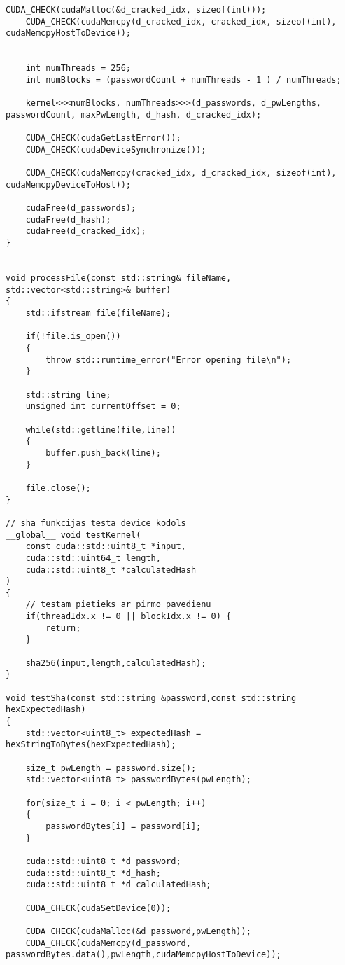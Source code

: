 \documentclass[12pt]{report}%
\theoremstyle{definition}
\begin{document}
\begin{lstlisting}[caption={Paroļu lauzēja implementācija CUDA vidē},
  label=lst:cuda_impl,
  captionpos=t
  ]
    CUDA_CHECK(cudaMalloc(&d_cracked_idx, sizeof(int)));
    CUDA_CHECK(cudaMemcpy(d_cracked_idx, cracked_idx, sizeof(int), cudaMemcpyHostToDevice));

       
    int numThreads = 256;
    int numBlocks = (passwordCount + numThreads - 1 ) / numThreads;

    kernel<<<numBlocks, numThreads>>>(d_passwords, d_pwLengths, passwordCount, maxPwLength, d_hash, d_cracked_idx);

    CUDA_CHECK(cudaGetLastError());
    CUDA_CHECK(cudaDeviceSynchronize());

    CUDA_CHECK(cudaMemcpy(cracked_idx, d_cracked_idx, sizeof(int), cudaMemcpyDeviceToHost));

    cudaFree(d_passwords);
    cudaFree(d_hash);
    cudaFree(d_cracked_idx);
}


void processFile(const std::string& fileName, std::vector<std::string>& buffer)
{
    std::ifstream file(fileName);

    if(!file.is_open())
    {
        throw std::runtime_error("Error opening file\n");
    }

    std::string line;
    unsigned int currentOffset = 0;
    
    while(std::getline(file,line))
    {
        buffer.push_back(line);
    }

    file.close();
}

// sha funkcijas testa device kodols
__global__ void testKernel(
    const cuda::std::uint8_t *input,
    cuda::std::uint64_t length,
    cuda::std::uint8_t *calculatedHash
)
{
    // testam pietieks ar pirmo pavedienu
    if(threadIdx.x != 0 || blockIdx.x != 0) {
        return;
    }

    sha256(input,length,calculatedHash);
}

void testSha(const std::string &password,const std::string hexExpectedHash)
{
    std::vector<uint8_t> expectedHash = hexStringToBytes(hexExpectedHash);

    size_t pwLength = password.size();
    std::vector<uint8_t> passwordBytes(pwLength);

    for(size_t i = 0; i < pwLength; i++)
    {
        passwordBytes[i] = password[i];
    }

    cuda::std::uint8_t *d_password;
    cuda::std::uint8_t *d_hash;
    cuda::std::uint8_t *d_calculatedHash;

    CUDA_CHECK(cudaSetDevice(0));

    CUDA_CHECK(cudaMalloc(&d_password,pwLength));
    CUDA_CHECK(cudaMemcpy(d_password, passwordBytes.data(),pwLength,cudaMemcpyHostToDevice));
    

\end{lstlisting}
\end{document}
